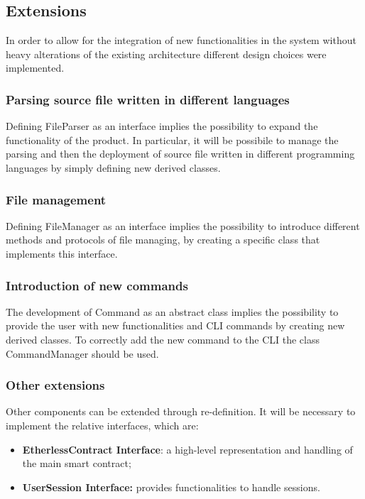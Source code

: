 \subsection{Extensions}
In order to allow for the integration of new functionalities in the system without heavy alterations of the existing architecture different design choices were implemented.

\subsubsection{Parsing source file written in different languages}
Defining FileParser as an interface implies the possibility to expand the functionality of the product. In particular, it will be possibile to manage the parsing and then the deployment of source file written in different programming languages by simply defining new derived classes.

\subsubsection{File management}
Defining FileManager as an interface implies the possibility to introduce different methods and protocols of file managing, by creating a specific class that implements this interface.

\subsubsection{Introduction of new commands}
The development of Command as an abstract class implies the possibility to provide the user with new functionalities and CLI commands by creating new derived classes. To correctly add the new command to the CLI the class CommandManager should be used.

\subsubsection{Other extensions}
Other components can be extended through re-definition. It will be necessary to implement the relative interfaces, which are:
\begin{itemize}
	\item \textbf{EtherlessContract Interface}: a high-level representation and handling of the main smart contract;
	\item \textbf{UserSession Interface:} provides functionalities to handle sessions.
\end{itemize}
